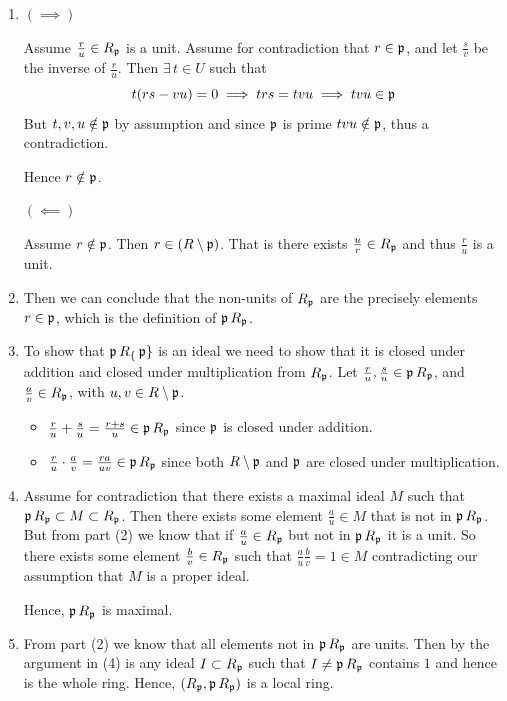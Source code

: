 \documentclass[Notebook.tex]{subfiles}
\begin{document}
\begin{solution}
	\bbni
	\begin{enumerate}
		\item $(\implies)$ 
		
		Assume $\frac{r}{u} \in R_{\fp}$ is a unit. Assume for contradiction that $r \in \fp$, and let $\frac{s}{v}$ be the inverse of $\frac{r}{u}$. Then $\exists \, t \in U$ such that
		\[t(rs - vu) = 0  \implies trs = tvu \implies tvu \in \fp\]
		But $t, v, u \notin \fp$ by assumption and since $\fp$ is prime $tvu \notin \fp$, thus a contradiction. 
		
		Hence $r \notin \fp$. 

		$(\impliedby)$ 

		Assume $r \notin \fp$. Then $r \in (R \setminus \fp)$. That is there exists $\frac{u}{r} \in R_{\fp}$ and thus $\frac{r}{u}$ is a unit. 

		\item Then we can conclude that the non-units of $R_{\fp}$ are the precisely elements $r \in \fp$, which is the definition of $\fp R_{\fp}$.
		
		\item To show that $\fp R_\{\fp\}$ is an ideal we need to show that it is closed under addition and closed under multiplication from $R_{\fp}$. Let $\frac{r}{u}, \frac{s}{u} \in \fp R_{\fp}$, and $\frac{a}{v} \in R_{\fp}$, with $u, v \in R \setminus \fp$. 
		\begin{itemize}
			\item $\frac{r}{u} + \frac{s}{u} = \frac{r + s}{u} \in \fp R_{\fp}$ since $\fp$ is closed under addition. 
			\item $\frac{r}{u} \cdot \frac{a}{v} = \frac{ra}{uv} \in \fp R_{\fp}$ since both $R \setminus \fp$ and $\fp$ are closed under multiplication. 
		\end{itemize}

		\item Assume for contradiction that there exists a maximal ideal $M$ such that $\fp R_{\fp} \subset M \subset R_{\fp}$. Then there exists some element $\frac{a}{u} \in M$ that is not in $\fp R_{\fp}$. But from part (2) we know that if $\frac{a}{u} \in R_{\fp}$ but not in $\fp R_{\fp}$ it is a unit. So there exists some element $\frac{b}{v} \in R_{\fp}$ such that $\frac{a}{u} \frac{b}{v} = 1 \in M$ contradicting our assumption that $M$ is a proper ideal. 
		
		Hence, $\fp R_{\fp}$ is maximal.
		
		\item From part (2) we know that all elements not in $\fp R_{\fp}$ are units. Then by the argument in (4) is any ideal $I \subset R_{\fp}$ such that $I \neq \fp R_{\fp}$ contains $1$ and hence is the whole ring. Hence, $(R_{\fp}, \fp R_{\fp})$ is a local ring. 
		

\end{enumerate}
\end{solution}
\end{document}
